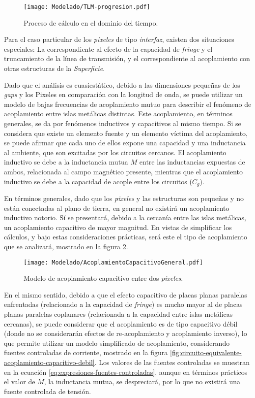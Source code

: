 \begin{figure}[h]
	\centering
	\texttt{[image: Modelado/TLM-progresion.pdf]}
	\caption{Proceso de cálculo en el dominio del tiempo.}
	\label{fig:procedimiento-tlm}
\end{figure}

Para el caso particular de los \textit{pixeles} de tipo \textit{interfaz}, existen dos situaciones especiales: La correspondiente al efecto de la capacidad de \textit{fringe} y el truncamiento de la línea de transmisión, y el correspondiente al acoplamiento con otras estructuras de la \textit{Superficie}.

Dado que el análisis es cuasiestático, debido a las dimensiones pequeñas de los \textit{gaps} y los Pixeles en comparación con la longitud de onda, se puede utilizar un modelo de bajas frecuencias de acoplamiento mutuo para describir el fenómeno de acoplamiento entre islas metálicas distintas. Este acoplamiento, en términos generales, se da por fenómenos inductivos y capacitivos al mismo tiempo. Si se considera que existe un elemento fuente y un elemento víctima del acoplamiento, se puede afirmar que cada uno de ellos expone una capacidad y una inductancia al ambiente, que son excitadas por los circuitos cercanos. El acoplamiento inductivo se debe a la inductancia mutua $M$ entre las inductancias expuestas de ambos, relacionada al campo magnético presente, mientras que el acoplamiento inductivo se debe a la capacidad de acople entre los circuitos ($C_{g}$).

En términos generales, dado que los \textit{pixeles} y las estructuras son pequeñas y no están conectadas al plano de tierra, en general no existirá un acoplamiento inductivo notorio. Sí se presentará, debido a la cercanía entre las islas metálicas, un acoplamiento capacitivo de mayor magnitud. En vistas de simplificar los cálculos, y bajo estas consideraciones prácticas, será este el tipo de acoplamiento que se analizará, mostrado en la figura \ref{fig:acoplamiento-capacitivo-modelo}.

\begin{figure}[h]
	\centering
	\texttt{[image: Modelado/AcoplamientoCapacitivoGeneral.pdf]}
	\caption{Modelo de acoplamiento capacitivo entre dos \textit{pixeles}.}
	\label{fig:acoplamiento-capacitivo-modelo}
\end{figure}


En el mismo sentido, debido a que el efecto capacitivo de placas planas paralelas enfrentadas (relacionado a la capacidad de \textit{fringe}) es mucho mayor al de placas planas paralelas coplanares (relacionada a la capacidad entre islas metálicas cercanas), se puede considerar que el acoplamiento es de tipo capacitivo débil \cite{Tesche:EMC} (donde no se considerarán efectos de re-acoplamiento y acoplamiento inverso), lo que permite utilizar un modelo simplificado de acoplamiento, considerando fuentes controladas de corriente, mostrado en la figura \ref{fig:circuito-equivalente-acoplamiento-capacitivo-debil}. Los valores de las fuentes controladas se muestran en la ecuación \ref{eq:expresiones-fuentes-controladas}, aunque en términos prácticos el valor de $M$, la inductancia mutua, se despreciará, por lo que no existirá una fuente controlada de tensión.


